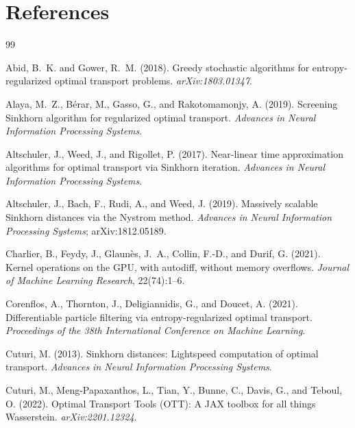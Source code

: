 \documentclass[11pt]{article}
\begin{document}
\section*{References}
\begin{thebibliography}{99}

Abid, B.~K. and Gower, R.~M. (2018).
\newblock Greedy stochastic algorithms for entropy-regularized optimal
transport problems.
\newblock \emph{arXiv:1803.01347}.

Alaya, M.~Z., B{\'e}rar, M., Gasso, G., and Rakotomamonjy, A. (2019).
\newblock Screening Sinkhorn algorithm for regularized optimal transport.
\newblock \emph{Advances in Neural Information Processing Systems}.

Altschuler, J., Weed, J., and Rigollet, P. (2017).
\newblock Near-linear time approximation algorithms for optimal transport via
Sinkhorn iteration.
\newblock \emph{Advances in Neural Information Processing Systems}.

Altschuler, J., Bach, F., Rudi, A., and Weed, J. (2019).
\newblock Massively scalable Sinkhorn distances via the Nystrom method.
\newblock \emph{Advances in Neural Information Processing Systems};
arXiv:1812.05189.

Charlier, B., Feydy, J., Glaun{\`e}s, J.~A., Collin, F.-D., and Durif, G.
(2021).
\newblock Kernel operations on the GPU, with autodiff, without memory
overflows.
\newblock \emph{Journal of Machine Learning Research}, 22(74):1--6.

Corenflos, A., Thornton, J., Deligiannidis, G., and Doucet, A. (2021).
\newblock Differentiable particle filtering via entropy-regularized optimal
transport.
\newblock \emph{Proceedings of the 38th International Conference on Machine
Learning}.

Cuturi, M. (2013).
\newblock Sinkhorn distances: Lightspeed computation of optimal transport.
\newblock \emph{Advances in Neural Information Processing Systems}.

Cuturi, M., Meng-Papaxanthos, L., Tian, Y., Bunne, C., Davis, G., and Teboul, O.
(2022).
\newblock Optimal Transport Tools (OTT): A JAX toolbox for all things
Wasserstein.
\newblock \emph{arXiv:2201.12324}.


\end{thebibliography}
\end{document}
